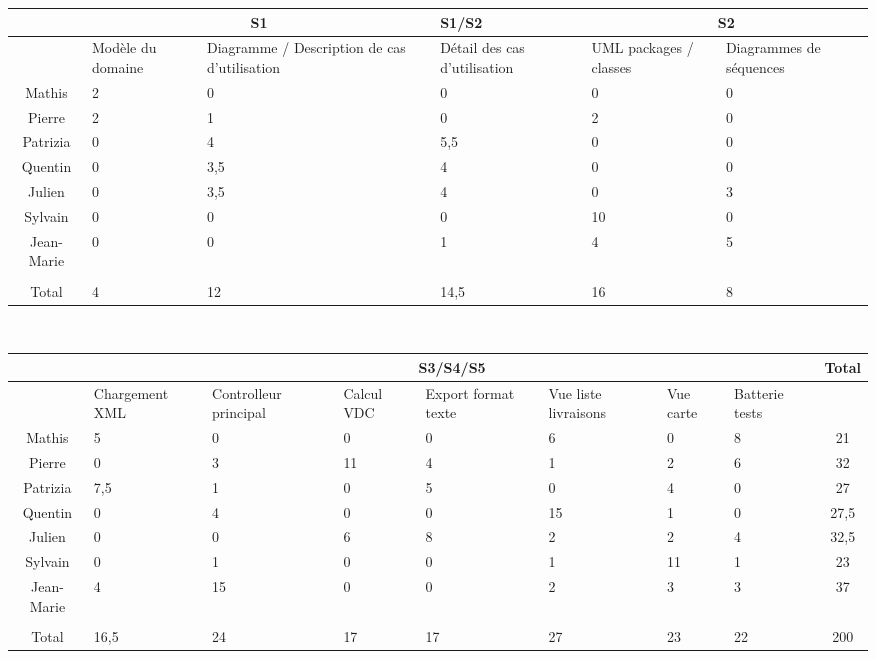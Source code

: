 \documentclass[a4paper]{report}
\begin{document}
\begin{tabular}{|c|p{2cm}|p{2cm}|p{2cm}|p{2.3cm}|p{2cm}|}
    \hline
    & \multicolumn{2}{|c|}{S1}  & S1/S2 & \multicolumn{2}{|c|}{S2} \\\hline
    & Modèle du domaine & Diagramme / Description de cas d'utilisation & Détail
    des cas d'utilisation & UML packages / classes & Diagrammes de séquences
    \\\hline
    Mathis & 2 & 0 & 0 & 0 & 0 \\\hline
    Pierre & 2 & 1 & 0 & 2 & 0 \\\hline
    Patrizia & 0 & 4 & 5,5 & 0 & 0 \\\hline
    Quentin & 0 & 3,5 & 4 & 0 & 0 \\\hline
    Julien & 0 & 3,5 & 4 & 0 & 3 \\\hline
    Sylvain & 0 & 0 & 0 & 10 & 0 \\\hline
    Jean-Marie & 0 & 0 & 1 & 4 & 5 \\\hline
    \multicolumn{6}{|c|}{} \\\hline
    Total & 4 & 12 & 14,5 & 16 & 8 \\\hline
\end{tabular}
~\\
\begin{tabular}{|c|p{2cm}|p{2cm}|p{1cm}|p{1cm}|p{1.7cm}|p{1cm}|p{1.3cm}|c|}
    \hline
    & \multicolumn{7}{|c|}{S3/S4/S5}  & Total  \\\hline
    & Chargement XML & Controlleur principal & Calcul VDC & Export format texte
    & Vue liste livraisons & Vue carte & Batterie tests &  \\\hline
    Mathis & 5 & 0 & 0 & 0 & 6 & 0 & 8 & 21 \\\hline
    Pierre & 0 & 3 & 11 & 4 & 1 & 2 & 6 & 32 \\\hline
    Patrizia & 7,5 & 1 & 0 & 5 & 0 & 4 & 0 & 27 \\\hline
    Quentin & 0 & 4 & 0 & 0 & 15 & 1 & 0 & 27,5 \\\hline
    Julien & 0 & 0 & 6 & 8 & 2 & 2 & 4 & 32,5 \\\hline
    Sylvain & 0 & 1 & 0 & 0 & 1 & 11 & 1 & 23 \\\hline
    Jean-Marie & 4 & 15 & 0 & 0 & 2 & 3 & 3 & 37 \\\hline
    \multicolumn{9}{|c|}{} \\\hline
    Total & 16,5 & 24 & 17 & 17 & 27 & 23 & 22 & 200 \\\hline
\end{tabular}
\end{document}
